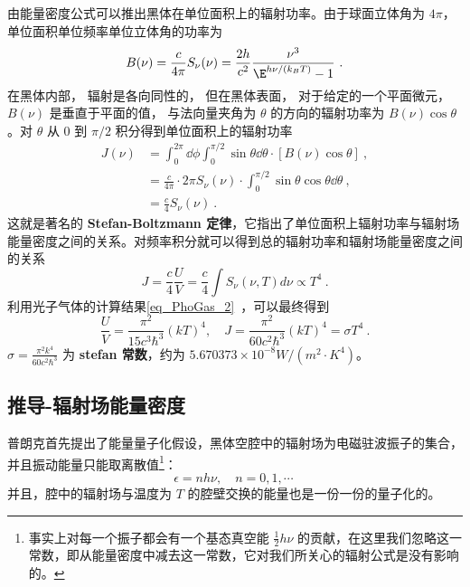 由能量密度公式可以推出黑体在单位面积上的辐射功率。由于球面立体角为 $4\pi$，单位面积单位频率单位立体角的功率为
\begin{equation}\label{eq_BBdLaw_2}
B(\nu) = \frac{c}{4\pi}S_\nu(\nu) = \frac{2h}{c^2} \frac{\nu^3}{\E^{h\nu/(k_B T)} - 1}~.
\end{equation}
在黑体内部， 辐射是各向同性的， 但在黑体表面， 对于给定的一个平面微元， $B(\nu)$ 是垂直于平面的值， 与法向量夹角为 $\theta$ 的方向的辐射功率为 $B(\nu)\cos\theta$。对 $\theta$ 从 $0$ 到 $\pi/2$ 积分得到单位面积上的辐射功率
\begin{equation}
\begin{aligned}
J(\nu)&=\int_0^{2\pi} \dd\phi \int_0^{\pi/2} \sin\theta \dd \theta \cdot \left[B(\nu)\cos\theta\right] ~,\\
&=\frac{c}{4\pi}\cdot 2\pi S_\nu(\nu) \cdot \int_0^{\pi/2} \sin\theta\cos\theta \dd\theta ~,\\
&= \frac{c}{4} S_\nu(\nu) ~.
\end{aligned}
\end{equation}
这就是著名的 \textbf{Stefan-Boltzmann 定律}，它指出了单位面积上辐射功率与辐射场能量密度之间的关系。对频率积分就可以得到总的辐射功率和辐射场能量密度之间的关系
\begin{equation}
J=\frac{c}{4} \frac{U}{V}=\frac{c}{4} \int S_\nu(\nu,T) d\nu\propto T^4~.
\end{equation}
利用光子气体的计算结果\autoref{eq_PhoGas_2}~，可以最终得到
\begin{equation}
\frac{U}{V}=\frac{\pi^2}{15c^3\hbar^3}(kT)^4,\quad J=\frac{\pi^2}{60c^2\hbar^3}(kT)^4= \sigma T^4~.
\end{equation}
$\sigma=\frac{\pi^2 k^4}{60c^2\hbar^3}$ 为 \textbf{stefan 常数}，约为 $5.670373\times 10^{-8}W/(m^2\cdot K^4)$。


\subsection{推导-辐射场能量密度}
普朗克首先提出了能量量子化假设，黑体空腔中的辐射场为电磁驻波振子的集合，并且振动能量只能取离散值\footnote{事实上对每一个振子都会有一个基态真空能 $\frac{1}{2}h\nu$ 的贡献，在这里我们忽略这一常数，即从能量密度中减去这一常数，它对我们所关心的辐射公式是没有影响的。}：
\begin{equation}
\epsilon = nh\nu, \quad n=0,1,\cdots~
\end{equation}
并且，腔中的辐射场与温度为 $T$ 的腔壁交换的能量也是一份一份的量子化的。

